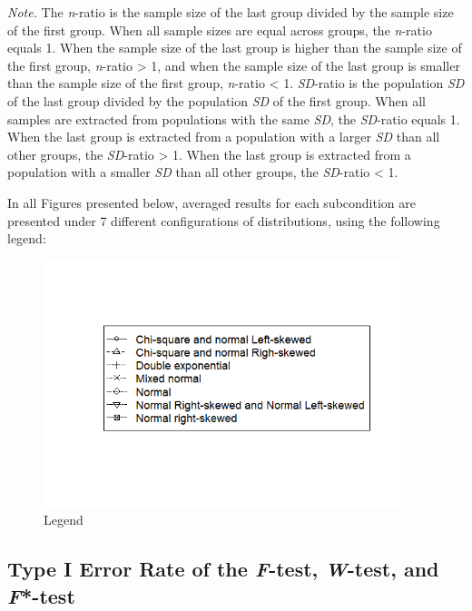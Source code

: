 \documentclass[man,floatsintext]{apa6}
\begin{document}
\emph{Note.} The \emph{n}-ratio is the sample size of the last group divided by the sample size of the first group. When all sample sizes are equal across groups, the \emph{n}-ratio equals 1. When the sample size of the last group is higher than the sample size of the first group, \emph{n}-ratio \textgreater{} 1, and when the sample size of the last group is smaller than the sample size of the first group, \emph{n}-ratio \textless{} 1. \emph{SD}-ratio is the population \emph{SD} of the last group divided by the population \emph{SD} of the first group. When all samples are extracted from populations with the same \emph{SD}, the \emph{SD}-ratio equals 1. When the last group is extracted from a population with a larger \emph{SD} than all other groups, the \emph{SD}-ratio \textgreater{} 1. When the last group is extracted from a population with a smaller \emph{SD} than all other groups, the \emph{SD}-ratio \textless{} 1.

In all Figures presented below, averaged results for each subcondition are presented under 7 different configurations of distributions, using the following legend:

\begin{figure}
\includegraphics[width=400px]{Rmarkdown folder/Rmarkdown inputs/legend} \caption{Legend}\label{fig:unnamed-chunk-1}
\end{figure}

\hypertarget{type-i-error-rate-of-the-f-test-w-test-and-f-test}{%
\subsection{\texorpdfstring{Type I Error Rate of the \emph{F}-test, \emph{W}-test, and \emph{F}*-test}{Type I Error Rate of the F-test, W-test, and F*-test}}\label{type-i-error-rate-of-the-f-test-w-test-and-f-test}}
\end{document}
